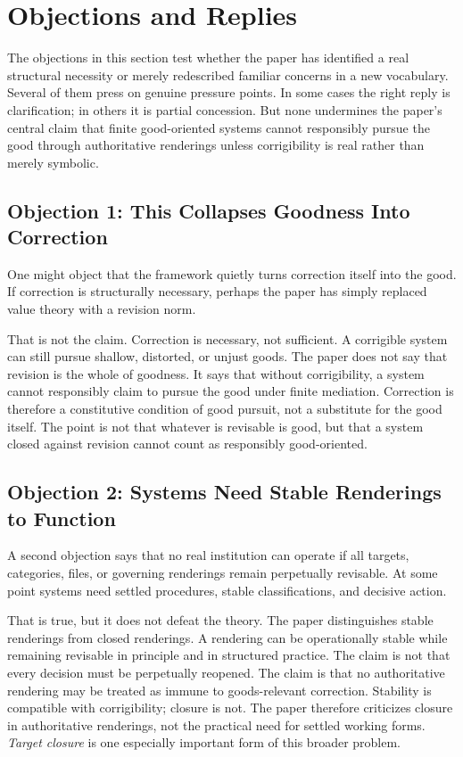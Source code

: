 \documentclass[11pt]{article}
\renewcommand{\emph}[1]{\textit{#1}}
\begin{document}
\section{Objections and Replies}

The objections in this section test whether the paper has identified a real structural necessity or merely redescribed familiar concerns in a new vocabulary. Several of them press on genuine pressure points. In some cases the right reply is clarification; in others it is partial concession. But none undermines the paper's central claim that finite good-oriented systems cannot responsibly pursue the good through authoritative renderings unless corrigibility is real rather than merely symbolic.

\subsection{Objection 1: This Collapses Goodness Into Correction}

One might object that the framework quietly turns correction itself into the good. If correction is structurally necessary, perhaps the paper has simply replaced value theory with a revision norm.

That is not the claim. Correction is necessary, not sufficient. A corrigible system can still pursue shallow, distorted, or unjust goods.\cite{Sen1999DevelopmentFreedom,Nussbaum2006FrontiersJustice} The paper does not say that revision is the whole of goodness. It says that without corrigibility, a system cannot responsibly claim to pursue the good under finite mediation. Correction is therefore a constitutive condition of good pursuit, not a substitute for the good itself. The point is not that whatever is revisable is good, but that a system closed against revision cannot count as responsibly good-oriented.

\subsection{Objection 2: Systems Need Stable Renderings to Function}

A second objection says that no real institution can operate if all targets, categories, files, or governing renderings remain perpetually revisable. At some point systems need settled procedures, stable classifications, and decisive action.

That is true, but it does not defeat the theory. The paper distinguishes stable renderings from closed renderings. A rendering can be operationally stable while remaining revisable in principle and in structured practice. The claim is not that every decision must be perpetually reopened. The claim is that no authoritative rendering may be treated as immune to goods-relevant correction. Stability is compatible with corrigibility; closure is not. The paper therefore criticizes closure in authoritative renderings, not the practical need for settled working forms. \emph{Target closure} is one especially important form of this broader problem.
\end{document}
